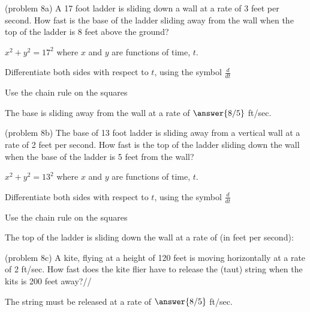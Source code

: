 \documentclass{ximera}
\begin{document}
\begin{problem}(problem 8a)
A 17 foot ladder is sliding down a wall at a rate of 3 feet per second.  How fast is the base of the 
ladder sliding away from the wall when the top of the ladder is 8 feet above the ground?\\

\begin{hint}
$x^2 + y^2 = 17^2$ where  $x$ and $y$ are functions of time, $t$.
\end{hint}

\begin{hint}
Differentiate both sides with respect to $t$, using the symbol $\frac{d}{dt}$
\end{hint}
\begin{hint}
Use the chain rule on the squares
\end{hint}

The base is sliding away from the wall at a rate of $\answer{8/5}$ ft/sec.
\end{problem}

\begin{problem}(problem 8b)
The base of 13 foot ladder is sliding away from a vertical wall at a rate of 2 
feet per second.  How fast is the top of the ladder sliding down the wall when the base of the 
ladder is 5 feet from the wall?
\begin{hint}
$x^2 + y^2 = 13^2$ where  $x$ and $y$ are functions of time, $t$.
\end{hint}

\begin{hint}
Differentiate both sides with respect to $t$, using the symbol $\frac{d}{dt}$
\end{hint}
\begin{hint}
Use the chain rule on the squares
\end{hint}

The top of the ladder is sliding down the wall at a rate of (in feet per second):
\begin{multipleChoice}
\end{multipleChoice}
\end{problem}


\begin{problem}(problem 8c)
A kite, flying at a height of 120 feet is moving horizontally at a rate of 2 ft/sec.  How fast does the kite flier have to release the (taut) string when the kits is 200 feet away?//

The string must be released at a rate of $\answer{8/5}$ ft/sec.


\end{problem}
\end{document}
